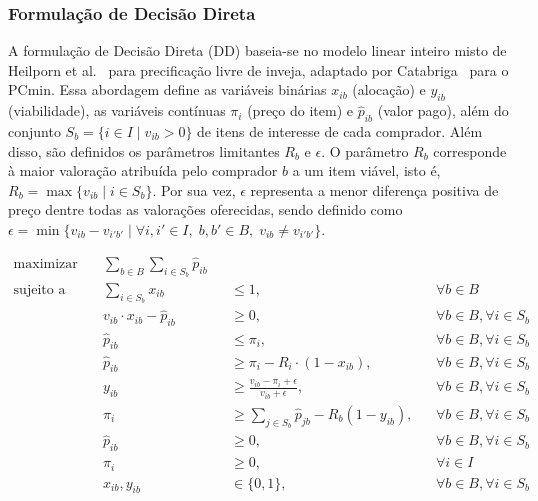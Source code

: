 \documentclass[11pt]{article}
\begin{document}
\subsubsection{Formulação de Decisão Direta}

A formulação de Decisão Direta (DD) baseia-se no modelo linear inteiro misto de Heilporn et al.~\cite{heilporn2010} para precificação livre de inveja, adaptado por Catabriga~\cite{catabriga2025} para o PCmin. Essa abordagem define as variáveis binárias $x_{ib}$ (alocação) e $y_{ib}$ (viabilidade), as variáveis contínuas $\pi_i$ (preço do item) e $\hat{p}_{ib}$ (valor pago), além do conjunto $S_b = \{i \in I \mid v_{ib} > 0\}$ de itens de interesse de cada comprador. Além disso, são definidos os parâmetros limitantes $R_b$ e $\epsilon$. O parâmetro $R_b$ corresponde à maior valoração atribuída pelo comprador $b$ a um item viável, isto é, $R_b = \max\{v_{ib} \mid i \in S_b\}$. Por sua vez, $\epsilon$ representa a menor diferença positiva de preço dentre todas as valorações oferecidas, sendo definido como $\epsilon = \min\{v_{ib} - v_{i'b'} \mid \forall i,i' \in I,\; b,b' \in B,\; v_{ib} \neq v_{i'b'}\}$.

\begin{align}
\text{maximizar} \quad & \sum_{b \in B} \sum_{i \in S_b} \hat{p}_{ib} \label{dd_obj} \\
\text{sujeito a} \quad & \sum_{i \in S_b} x_{ib} &&\leq 1, &&\forall b \in B \label{dd_1} \\
& v_{ib} \cdot x_{ib} - \hat{p}_{ib} &&\geq 0, &&\forall b \in B, \forall i \in S_b \label{dd_2} \\
& \hat{p}_{ib} &&\leq \pi_i, &&\forall b \in B, \forall i \in S_b \label{dd_3} \\
& \hat{p}_{ib} &&\geq \pi_i - R_i \cdot (1 - x_{ib}), &&\forall b \in B, \forall i \in S_b \label{dd_4}  \\
& y_{ib} &&\geq \frac{v_{ib} - \pi_i + \epsilon}{v_{ib} + \epsilon}, &&\forall b \in B, \forall i \in S_b \label{dd_viab}  \\
& \pi_i &&\geq \sum_{j \in S_b} \hat{p}_{jb} - R_b(1 - y_{ib}), &&\forall b \in B, \forall i \in S_b \label{dd_pcm}  \\
& \hat{p}_{ib} &&\geq 0, &&\forall b \in B, \forall i \in S_b \label{dd_5} \\
& \pi_i &&\geq 0, &&\forall i \in I \label{dd_6}  \\
& x_{ib}, y_{ib} &&\in \{0, 1\}, &&\forall b \in B, \forall i \in S_b \label{dd_7} 
\end{align}
\end{document}
